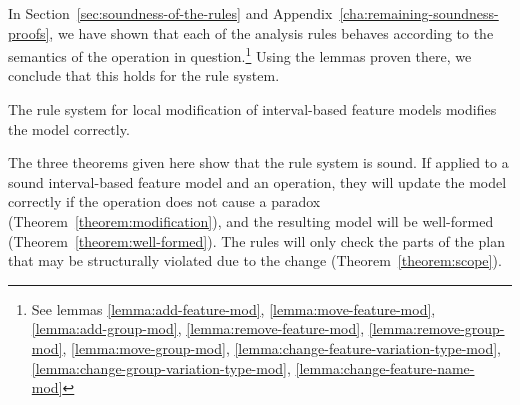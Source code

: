 In Section~\vref{sec:soundness-of-the-rules} and Appendix~\ref{cha:remaining-soundness-proofs}, we have shown that each of the analysis rules behaves according to the semantics of the operation in question.\footnote{See lemmas \ref{lemma:add-feature-mod}, \ref{lemma:move-feature-mod}, \ref{lemma:add-group-mod}, \ref{lemma:remove-feature-mod}, \ref{lemma:remove-group-mod}, \ref{lemma:move-group-mod}, \ref{lemma:change-feature-variation-type-mod}, \ref{lemma:change-group-variation-type-mod}, \ref{lemma:change-feature-name-mod}} Using the lemmas proven there, we conclude that this holds for the rule system.
\\
\begin{theorem}
  The rule system for local modification of interval-based feature models modifies the model correctly.
  \label{theorem:modification}
\end{theorem}

The three theorems given here show that the rule system is sound. If applied to a sound interval-based feature model and an operation, they will update the model correctly if the operation does not cause a paradox (Theorem~\ref{theorem:modification}), and the resulting model will be well-formed (Theorem~\ref{theorem:well-formed}). The rules will only check the parts of the plan that may be structurally violated due to the change (Theorem~\ref{theorem:scope}).
